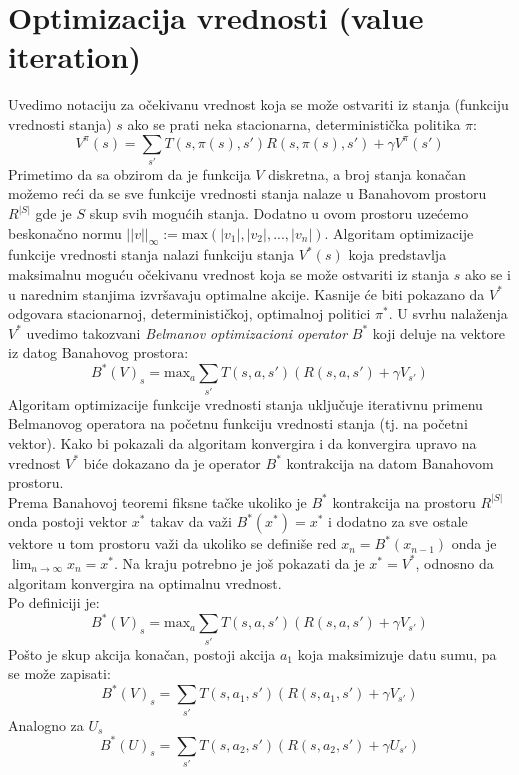 \documentclass[a4paper,fleqn,12pt]{JMThesis}
\newcommand{\latin}{\fontencoding{T1}\selectfont\selectlanguage{english}}
\theoremstyle{plain}
\theoremstyle{definition}
\newcommand{\piopt}{{\pi}^{*}}
\theoremstyle{definition}
\begin{document}
\section{Optimizacija vrednosti (\latin value iteration)}
Uvedimo notaciju za očekivanu vrednost koja se može ostvariti iz stanja (funkciju vrednosti stanja) $s$ ako se prati neka stacionarna, deterministička politika $\pi$:
\[
	V^{\pi}(s) = \sum_{s'}T(s,\pi(s),s')R(s,\pi(s),s') + \gamma V^{\pi}(s')
\]
Primetimo da sa obzirom da je funkcija $V$ diskretna, a broj stanja konačan možemo reći da se sve funkcije vrednosti stanja
nalaze u Banahovom prostoru $R^{|S|}$ gde je $S$ skup svih mogućih stanja. Dodatno u ovom prostoru uzećemo beskonačno normu
$||v||_{\infty} := \text{max}(|v_{1}|,|v_{2}|,...,|v_{n}|)$.
Algoritam optimizacije funkcije vrednosti stanja nalazi funkciju stanja $V^{*}(s)$ koja predstavlja maksimalnu moguću
očekivanu vrednost koja se može ostvariti iz stanja $s$ ako se i u narednim stanjima izvršavaju optimalne akcije.
Kasnije će biti pokazano da $V^{*}$ odgovara stacionarnoj, determinističkoj, optimalnoj politici $\piopt$.
U svrhu nalaženja $V^{*}$ uvedimo takozvani \textit{Belmanov optimizacioni operator} $B^{*}$ koji deluje na vektore
iz datog Banahovog prostora:
\[
	B^{*}(V)_s = \text{max}_{a}\sum_{s'}T(s,a,s')(R(s,a,s') + \gamma V_{s'})
\]
Algoritam optimizacije funkcije vrednosti stanja uključuje iterativnu primenu Belmanovog operatora na 
početnu funkciju vrednosti stanja (tj. na početni vektor). Kako bi pokazali da algoritam konvergira i da konvergira upravo 
na vrednost $V^{*}$ biće dokazano da je operator $B^{*}$ kontrakcija na datom Banahovom prostoru.\\ 
Prema Banahovoj teoremi fiksne tačke ukoliko je $B^{*}$ kontrakcija na prostoru $R^{|S|}$ 
onda postoji vektor $x^*$ takav da važi $B^{*}(x^{*}) = x^{*}$ i dodatno za sve ostale vektore u tom prostoru 
važi da ukoliko se definiše red $x_n = B^{*}(x_{n-1})$ onda je $\lim_{n \to \infty} x_n = x^*$. Na kraju potrebno je
još pokazati da je $x^{*} = V^{*}$, odnosno da algoritam konvergira na optimalnu vrednost.
\teo{$(\forall U \in R^{|S|}, \forall V \in R^{|S|}, U \neq V ) ||B^*(V) - B^*(U)||_{\infty} \leq k ||V - U||_{\infty}$ gde $k \in [0,1)$}\\
Po definiciji je:
\[ B^*(V)_s = \text{max}_{a}\sum_{s'}T(s,a,s')(R(s,a,s')+\gamma V_{s'}) \]
Pošto je skup akcija konačan, postoji akcija $a_1$ koja maksimizuje datu sumu, pa se može zapisati:
\[	B^*(V)_s = \sum_{s'}T(s,a_1,s')(R(s,a_1,s')+\gamma V_{s'}) \]
Analogno za $U_s$
\[	B^*(U)_s = \sum_{s'}T(s,a_2,s')(R(s,a_2,s')+\gamma U_{s'}) \]
\end{document}

